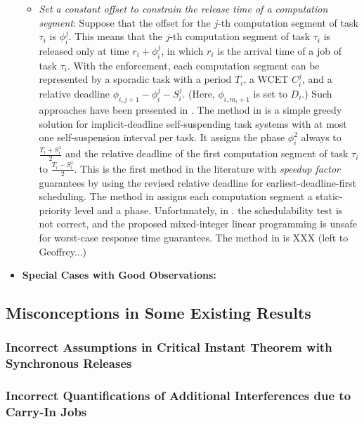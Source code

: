 \begin{itemize}
\begin{itemize}
  \item {\it Set a constant offset to constrain the release time of a computation segment}: Suppose that the offset for the $j$-th computation segment of task $\tau_i$ is $\phi_i^j$. This means that the $j$-th computation segment of task $\tau_i$ is released only at time $r_i+\phi_i^j$, in which $r_i$ is the arrival time of a job of task $\tau_i$. With the enforcement, each computation segment can be represented by a sporadic task with a period $T_i$, a WCET $C_i^j$, and a relative deadline $\phi_{i,j+1}-\phi_i^j-S_i^j$. (Here, $\phi_{i,m_i+1}$ is set to $D_i$.) Such approaches have been presented in \cite{RTSS-KimANR13,LR:rtas10,RTSS-ChenL14}. The method in \cite{RTSS-ChenL14} is a simple greedy solution for implicit-deadline self-suspending task systems with at most one self-suspension interval per task. It assigns the phase $\phi_i^2$ always to $\frac{T_i+S_i^1}{2}$ and the relative deadline of the first computation segment of task $\tau_i$ to $\frac{T_i-S_i^1}{2}$. This is the first method in the literature with \emph{speedup factor} guarantees by using the revised relative deadline for earliest-deadline-first scheduling. The method in \cite{RTSS-KimANR13} assigns each computation segment a static-priority level and a phase. Unfortunately,  in \cite{RTSS-KimANR13}. the schedulability test is not correct, and the proposed mixed-integer linear programming is unsafe for worst-case response time guarantees. The method in \cite{LR:rtas10} is XXX (left to Geoffrey...)
  \end{itemize}
\item {\bf Special Cases with Good Observations:}
\end{itemize}


\subsection{Misconceptions in Some Existing Results}
\subsubsection{Incorrect Assumptions in Critical Instant Theorem with Synchronous Releases}
\label{sec:wrong-critical}

\subsubsection{Incorrect Quantifications of Additional Interferences due to Carry-In Jobs}
\label{sec:wrong-carryin}


